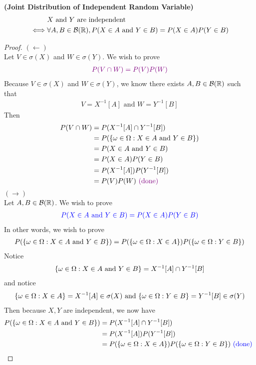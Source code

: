 \documentclass{report}
\begin{document}
\begin{theorem}
\label{3.2.5}
\textbf{(Joint Distribution of Independent Random Variable)} 
\begin{align*}
&X\text{ and }Y\text{ are independent }\\
\iff & \forall A,B \in \mathcal{B}(\mathbb{R}), P(X\in A\text{ and }Y\in B)=P(X\in A)P(Y\in B)
\end{align*}
\end{theorem}
\begin{proof}
$(\longleftarrow)$\\

Let $V\in \sigma (X)$ and $W\in \sigma (Y)$. We wish to prove 
\begin{align*}
  \textcolor{violet}{P(V\cap W)=P(V)P(W)}
\end{align*}
Because $V\in \sigma (X)$ and $W\in \sigma (Y)$, we know there exists $A,B\in \mathcal{B}(\mathbb{R})$ such that 
\begin{align*}
V=X^{-1}[A]\text{ and }W=Y^{-1}[B]
\end{align*}
Then 
\begin{align*}
P(V\cap W)&=P(X^{-1}[A]\cap Y^{-1}[B])\\
&=P(\{ \omega \in \Omega: X\in A\text{ and }Y\in B \})\\
&=P(X\in A\text{ and }Y\in B)\\
&=P(X\in A)P(Y\in B)\\
&=P(X^{-1}[A])P(Y^{-1}[B])\\
&=P(V)P(W)\textcolor{violet}{\text{ (done) }}
\end{align*}
$(\longrightarrow)$\\

Let $A,B\in \mathcal{B}(\mathbb{R})$. We wish to prove 
\begin{align*}
\textcolor{blue}{P(X\in A\text{ and }Y\in B)=P(X\in A)P(Y\in B)}
\end{align*}
In other words, we wish to prove 
\begin{align*}
P(\{ \omega\in\Omega:X\in A\text{ and }Y\in B \})=P(\{ \omega\in\Omega:X\in A \})P(\{ \omega\in\Omega:Y\in B \})
\end{align*}
Notice 
\begin{align*}
\{ \omega \in \Omega:X\in A\text{ and }Y\in B \}=X^{-1}[A]\cap Y^{-1}[B]
\end{align*}
and notice 
\begin{align*}
\{ \omega\in\Omega:X\in A \}=X^{-1}[A]\in \sigma(X)\text{ and }\{ \omega\in\Omega:Y\in B \}=Y^{-1}[B]\in \sigma (Y)
\end{align*}
Then because $X,Y$ are independent, we now have 
 \begin{align*}
P(\{ \omega\in \Omega:X\in A\text{ and }Y\in B \})&=P(X^{-1}[A]\cap Y^{-1}[B])\\
&=P(X^{-1}[A])P(Y^{-1}[B])\\
&=P(\{ \omega\in \Omega:X\in A \})P(\{ \omega\in\Omega:Y\in B \}) \textcolor{blue}{\text{ (done) }}
\end{align*}



\end{proof}
\end{document}
